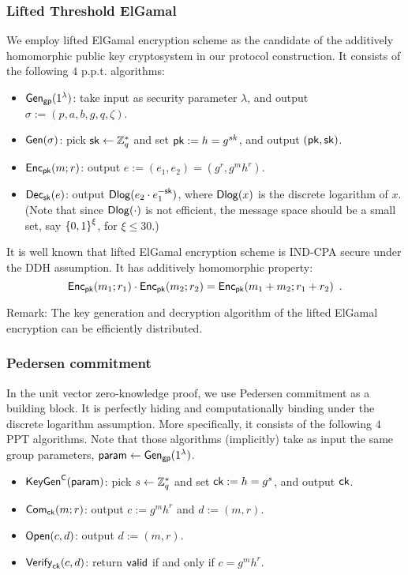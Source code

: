 \subsubsection{Lifted Threshold ElGamal} \label{sec:elgamal}
We employ lifted ElGamal encryption scheme as the candidate of the additively homomorphic public key cryptosystem in our protocol construction. It consists of the following $4$ p.p.t. algorithms:
\begin{itemize}
\item $\mathsf{Gen}_{\mathsf{gp}}(1^\lambda)$: take input as security parameter $\lambda$, and output $\sigma:=(p,a,b,g,q,\zeta)$.
\item $\mathsf{Gen}(\sigma)$: pick $\mathsf{sk}\leftarrow \mathbb{Z}_q^*$ and set $\mathsf{pk}:=h=g^{sk}$, and output $(\mathsf{pk},\mathsf{sk})$. 
\item $\mathsf{Enc}_{\mathsf{pk}}(m;r)$: output $e:=(e_1,e_2)=(g^r,g^m h^r)$.
\item $\mathsf{Dec}_{\mathsf{sk}}(e)$: output $\mathsf{Dlog}(e_2\cdot e_1^{-\mathsf{sk}})$, where $\mathsf{Dlog}(x)$ is the discrete logarithm of $x$. (Note that since $\mathsf{Dlog}(\cdot)$ is not efficient, the message space should be a small set, say $\left\{0,1\right\}^\xi$, for $\xi\leq30$.)
\end{itemize}

It is well known that lifted ElGamal encryption scheme is IND-CPA secure under the DDH assumption. It has additively homomorphic property: $$\mathsf{Enc}_{\mathsf{pk}}(m_1;r_1) \cdot \mathsf{Enc}_{\mathsf{pk}}(m_2;r_2) = \mathsf{Enc}_{\mathsf{pk}}(m_1 + m_2 ;r_1+ r_2 )\enspace.$$

Remark: The key generation and decryption algorithm of the lifted ElGamal encryption can be efficiently distributed.

\subsubsection{Pedersen commitment}
In the unit vector zero-knowledge proof, we use Pedersen commitment as a building block. It is perfectly hiding and computationally binding under the discrete logarithm assumption. 
More specifically, it consists of the following $4$ PPT algorithms. Note that those algorithms (implicitly) take as input the same group parameters, $\mathsf{param}\leftarrow \mathsf{Gen}_{\mathsf{gp}}(1^{\lambda})$. 

\begin{itemize}
\item $\mathsf{KeyGen}^{\mathsf{C}}(\mathsf{param})$: pick $s\leftarrow \mathbb{Z}_q^*$ and set $\mathsf{ck}:=h=g^{s}$, and output $\mathsf{ck}$. 
\item $\mathsf{Com}_{\mathsf{ck}}(m;r)$: output $c:=g^m h^r$ and $d:=(m,r)$.
\item $\mathsf{Open}(c, d)$: output $d:=(m,r)$. 
\item $\mathsf{Verify}_{\mathsf{ck}}(c,d)$: return $\mathsf{valid}$ if and only if  $c = g^m h^r$.
\end{itemize}

